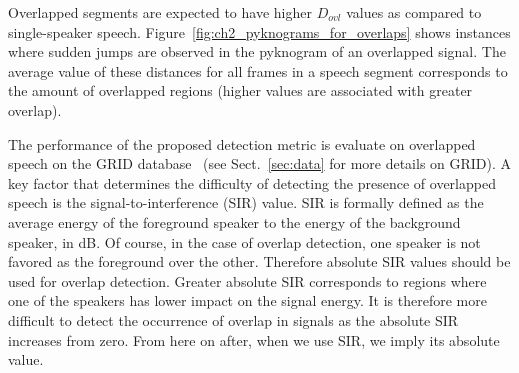 {Overlapped segments are expected to have higher $D_{ovl}$ values as compared to single-speaker speech. 
Figure~\ref{fig:ch2_pyknograms_for_overlaps} shows instances where sudden jumps are observed in the pyknogram of an overlapped signal. 
The average value of these distances for all frames in a speech segment corresponds to the amount of overlapped regions (higher values are associated with greater overlap). 

The performance of the proposed detection metric is evaluate on overlapped speech on the GRID database~\cite{SSC_link} (see Sect.~\ref{sec:data} for more details on GRID). 
A key factor that determines the difficulty of detecting the presence of overlapped speech is the signal-to-interference (SIR) value. 
SIR is formally defined as the average energy of the foreground speaker to the energy of the background speaker, in dB. 
Of course, in the case of overlap detection, one speaker is not favored as the foreground over the other. 
Therefore absolute SIR values should be used for overlap detection. 
Greater absolute SIR corresponds to regions where one of the speakers has lower impact on the signal energy. 
It is therefore more difficult to detect the occurrence of overlap in signals as the absolute SIR increases from zero.  
From here on after, when we use SIR, we imply its absolute value. 

}
